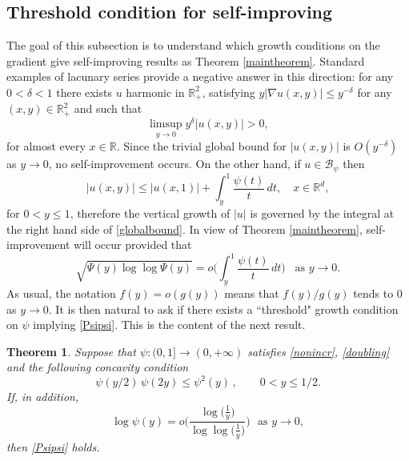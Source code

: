 \documentclass[11pt,letterpaper]{amsart}
\newtheorem{theorem}{Theorem}[section]
\theoremstyle{definition}
\numberwithin{equation}{section}
\newcommand{\R}{\mathbb R}
\begin{document}
\subsection{Threshold condition for self-improving}\label{thresub}

The goal of this subsection is to understand which growth conditions on the gradient give self-improving results as Theorem \ref{maintheorem}. Standard examples of lacunary series provide a negative answer in this direction: for any $0 < \delta < 1$ there exists $u$ harmonic in $\R^2_+$, satisfying $y|\nabla u(x,y)| \leq y^{ - \delta}$ for any $(x,y) \in \R_+^2$ and such that
$$
\limsup_{y\to 0} y^{\delta} |u(x,y)| >0, 
$$
for almost every $x\in \R$.  Since the trivial global bound for $|u(x,y)|$ is $O(y^{-\delta }) $ as $y \to 0 $, no self-improvement occurs. On the other hand,  if $u \in \mathcal{B}_{\psi } $ then
\begin{equation}\label{globalbound}
|u(x,y)| \leq |u(x,1)| + \int_y^1 \frac{\psi (t)}{t} \, dt, \quad x \in \R^d , 
\end{equation}
for $0< y \leq 1$, therefore the vertical growth of $|u|$ is governed by the integral at the right hand side of \eqref{globalbound}. In view of Theorem \ref{maintheorem},  self-improvement will occur provided that
\begin{equation}\label{Psipsi}
\sqrt{\Psi (y) \log \log \Psi (y)} = o \Big ( \int_y^1 \frac{\psi (t)}{t} \, dt \Big ) \, \, \, \, \, \text{as} \, \,  y \to 0 . 
\end{equation}
As usual, the notation $f(y) = o (g(y))$ means that $f(y) / g(y)$ tends to $0$
as $y \to 0$. It is then natural to ask if there exists a ``threshold" growth condition on $\psi$ implying \eqref{Psipsi}. This is the content of the next result.

\begin{theorem}\label{thmthreshold}
Suppose that $\psi :(0,1] \to (0,+\infty )$ satisfies \eqref{nonincr}, \eqref{doubling} and the following concavity condition
\begin{equation}\label{concav}
\psi (y/2) \, \psi(2y) \leq \psi^2 (y) \, , \qquad  0 < y \leq 1/2 . 
\end{equation}
If, in addition,
\begin{equation}\label{threshold}
\log \psi (y) = o \Big ( \frac{\log \big ( \frac{1}{y} \big)}{ \log \log \big ( \frac{1}{y} \big)}   \Big )  \, \, \, \, \text{as} \, \, y \to 0 , 
\end{equation}
then \eqref{Psipsi} holds.
\end{theorem}
\end{document}
